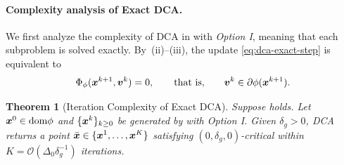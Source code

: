 \documentclass[english]{article}
\newtheorem{theorem}{Theorem}[section]
\begin{document}
\paragraph{Complexity analysis of Exact DCA.} We first analyze the complexity of DCA in  with \emph{Option I}, meaning that each subproblem is solved exactly. By \,(ii)--(iii), the update
\eqref{eq:dca-exact-step} is equivalent to
\begin{equation}
    \Phi_\phi(\bm{x}^{k+1},\bm{v}^k)=0,
    \qquad\text{that is,}\qquad
    \bm{v}^k\in\partial\phi(\bm{x}^{k+1}).
    \label{eq:dca-exact-optimality}
\end{equation}

\begin{theorem}[Iteration Complexity of Exact DCA]
\label{thm:dca-exact-complexity}
Suppose  holds. Let $\bm{x}^0\in\mathrm{dom}\phi$ and
$\{\bm{x}^k\}_{k\ge0}$ be generated by  with \emph{Option I}.
Given $\delta_g>0$, DCA returns a point $\bar{\bm{x}}\in\{\bm{x}^1,\ldots,\bm{x}^K\}$
satisfying $(0,\delta_g,0)$-critical within
$K=\mathcal O(\Delta_0 \delta_g^{-1})$ iterations.
\end{theorem}
\end{document}
